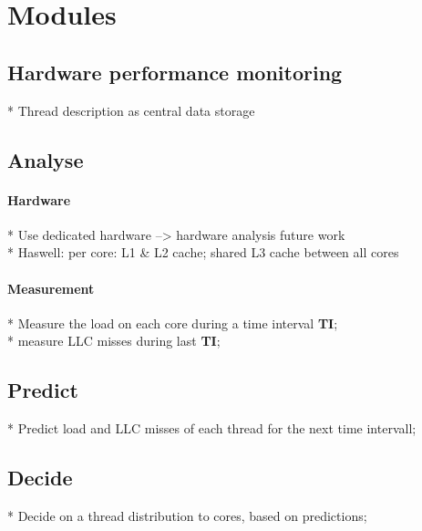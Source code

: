 \section{Modules}
\label{design:modules}

\subsection{Hardware performance monitoring}

* Thread description as central data storage


\subsection{Analyse}
  \paragraph{Hardware}
    * Use dedicated hardware --> hardware analysis future work \\
    * Haswell: per core: L1 \& L2 cache; shared L3 cache between all cores

  \paragraph{Measurement}
    * Measure the load on each core during a time interval \textbf{TI}; \\
    * measure LLC misses during last \textbf{TI};



\subsection{Predict}

  * Predict load and LLC misses of each thread for the next time intervall; \\



\subsection{Decide}

  * Decide on a thread distribution to cores, based on predictions;

